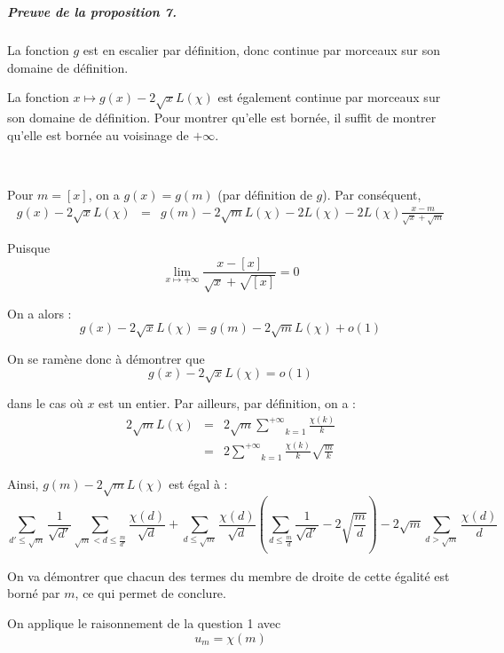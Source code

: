 \

\subparagraph{Preuve de la proposition 7.}

La fonction $g$ est en escalier par d{\'e}finition, donc continue par morceaux
sur son domaine de d{\'e}finition.

La fonction $x \longmapsto g (x) - 2 \sqrt{x} L (\chi)$ est {\'e}galement
continue par morceaux sur son domaine de d{\'e}finition. Pour montrer qu'elle
est born{\'e}e, il suffit de montrer qu'elle est born{\'e}e au voisinage de $+
\infty$.

\

Pour $m = [x]$, on a $g (x) = g (m)$ (par d{\'e}finition de $g$). Par
cons{\'e}quent,
\begin{eqnarray*}
  g (x) - 2 \sqrt{x} L (\chi) & = & g (m) - 2 \sqrt{m} L (\chi) - 2 L (\chi) -
  2 L (\chi) \frac{x - m}{\sqrt{x} + \sqrt{m}}
\end{eqnarray*}


Puisque
\[ \underset{x \longmapsto + \infty}{\lim}  \frac{x - [x]}{\sqrt{x} +
   \sqrt{[x]}} = 0 \]


On a alors :
\[ g (x) - 2 \sqrt{x} L (\chi) = g (m) - 2 \sqrt{m} L (\chi) + o (1) \]


On se ram{\`e}ne donc {\`a} d{\'e}montrer que
\[ g (x) - 2 \sqrt{x} L (\chi) = o (1) \]


dans le cas o{\`u} $x$ est un entier. Par ailleurs, par d{\'e}finition, on a :
\begin{eqnarray*}
  2 \sqrt{m} L (\chi) & = & 2 \sqrt{m} \underset{k = 1}{\overset{+
  \infty}{\sum}} \frac{\chi (k)}{k}\\
  & = & 2 \underset{k = 1}{\overset{+ \infty}{\sum}} \frac{\chi (k)}{k}
  \sqrt{\frac{m}{k}}
\end{eqnarray*}


Ainsi, $g (m) - 2 \sqrt{m} L (\chi)$ est {\'e}gal {\`a} :
\[ \underset{d' \leqslant \sqrt{m}}{\sum}  \frac{1}{\sqrt{d'}}
   \underset{}{\underset{\sqrt{m} < d \leqslant \frac{m}{d'}}{\sum}}
   \frac{\chi (d)}{\sqrt{d}} + \underset{d \leqslant \sqrt{m}}{\sum} 
   \frac{\chi (d)}{\sqrt{d}} \left( \underset{}{\underset{d \leqslant
   \frac{m}{d}}{\sum}} \frac{1}{\sqrt{d'}} - 2 \sqrt{\frac{m}{d}} \right) - 2
   \sqrt{m} \underset{d > \sqrt{m}}{\sum}  \frac{\chi (d)}{d} \]


On va d{\'e}montrer que chacun des termes du membre de droite de cette
{\'e}galit{\'e} est born{\'e} par $m$, ce qui permet de conclure.

On applique le raisonnement de la question 1 avec
\[ u_m = \chi (m) \]


